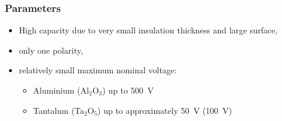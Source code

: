 \documentclass{beamer}
\begin{document}
	\begin{frame}
    \frametitle{Parameters}
		
		\begin{itemize}
			\item High capacity due to very small insulation thickness and large surface,
			\item only one polarity,
			\item relatively small maximum nominal voltage:
			
			\begin{itemize}
				\item Aluminium (Al$_2$O$_3$) up to 500~V
				\item Tantalum (Ta$_2$O$_5$) up to approximately 50~V (100~V)
			\end{itemize}
		\end{itemize}
  \end{frame}
\end{document}

